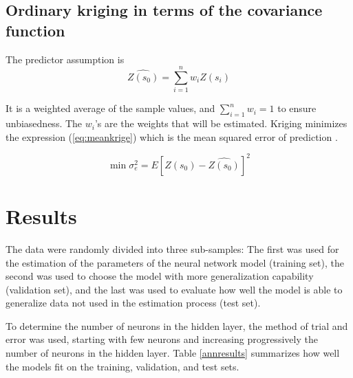 \documentclass[11pt,twoside]{rmta2010eng}%
\begin{document}
\subsection*{Ordinary kriging in terms of the covariance function}
The predictor assumption is 
\begin{equation}
\hat{Z(s_{0})} = \sum_{i=1}^{n} w_{i}Z(s_{i})
\end{equation}

It is a weighted average of the sample values, and $ \sum_{i=1}^{n} w_{i} = 1 $ to ensure unbiasedness. The $w_{i}$'s are the weights that will be estimated. Kriging minimizes the expression (\ref{eq:meankrige}) which is the mean squared error of prediction \cite{nicolas2015}. 

\begin{equation}
\min \sigma^{2}_{e} = E\left[Z(s_{0}) - \hat{Z(s_{0})}\right]^{2}
\label{eq:meankrige}
\end{equation}  



\section{Results}
The data were randomly divided into three sub-samples: The first was used for the
estimation of the parameters of the neural network model (training set), the second was used to choose the model with more generalization capability (validation set), and the last was
used to evaluate how well the model is able to generalize data not used in the estimation process (test set). 

To determine the number of neurons in the hidden layer, the method of trial and error was used, starting with few neurons and increasing progressively the number of neurons in the hidden layer. Table \ref{annresults}
summarizes how well the models fit on the training, validation, and test sets.
\end{document}
